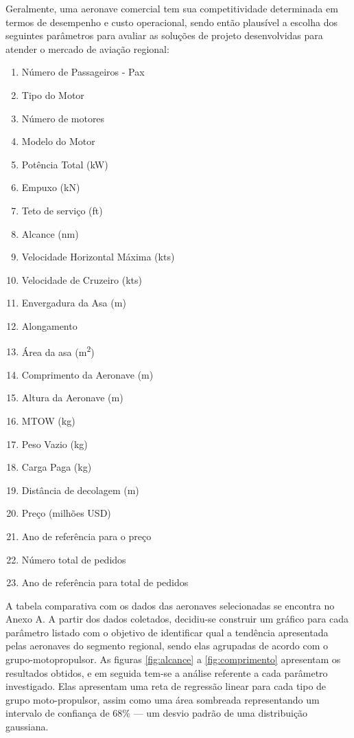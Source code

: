 Geralmente, uma aeronave comercial tem sua competitividade determinada em termos de desempenho e custo operacional, sendo então plausível a escolha dos seguintes parâmetros para avaliar as soluções de projeto desenvolvidas para atender o mercado de aviação regional:
\begin{multicols}{2}
  \begin{enumerate}
    \item Número de Passageiros - Pax
    \item Tipo do Motor
    \item Número de motores
    \item Modelo do Motor
    \item Potência Total (\si{kW})
    \item Empuxo (\si{kN})
    \item Teto de serviço (\si{ft})
    \item Alcance (\si{nm})
    \item Velocidade Horizontal Máxima (\si{kts})
    \item Velocidade de Cruzeiro (\si{kts})
    \item Envergadura da Asa (\si{m})
    \item Alongamento
    \item Área da asa (\si{m^2})
    \item Comprimento da Aeronave (\si{m})
    \item Altura da Aeronave (\si{m})
    \item MTOW (\si{kg})
    \item Peso Vazio (\si{kg})
    \item Carga Paga (\si{kg})
    \item Distância de decolagem (\si{m})
    \item Preço (milhões USD)
    \item Ano de referência para o preço
    \item Número total de pedidos
    \item Ano de referência para total de pedidos
  \end{enumerate}
\end{multicols}

A tabela comparativa com os dados das aeronaves selecionadas se encontra no Anexo A.
A partir dos dados coletados, decidiu-se construir um gráfico para cada parâmetro listado com o objetivo de identificar qual a tendência apresentada pelas aeronaves do segmento regional, sendo elas agrupadas de acordo com o grupo-motopropulsor.
As figuras \ref{fig:alcance} a \ref{fig:comprimento} apresentam os resultados obtidos, e em seguida tem-se a análise referente a cada parâmetro investigado.
Elas apresentam uma reta de regressão linear para cada tipo de grupo moto-propulsor, assim como uma área sombreada representando um intervalo de confiança de 68\% --- um desvio padrão de uma distribuição gaussiana.

